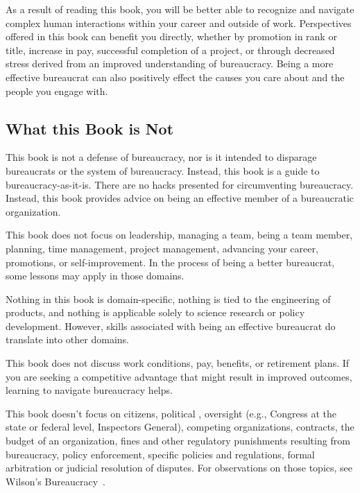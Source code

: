 As a result of reading this book, you will be better able to recognize and navigate complex human interactions within your career and outside of work. Perspectives offered in this book can benefit you directly, whether by promotion in rank or title, increase in pay, successful completion of a project, or through decreased stress derived from an improved understanding of  bureaucracy. Being a more effective bureaucrat can also positively effect the causes you care about and the people you engage with.



\subsection*{What this Book is Not}

This book is not a defense of bureaucracy, nor is it intended to disparage bureaucrats or the system of bureaucracy. Instead, this book is a guide to bureaucracy-as-it-is. There are no hacks presented for circumventing bureaucracy. Instead, this book provides advice on being an effective member of a bureaucratic organization.

This book does not focus on leadership, managing a team, being a team member, planning, time management, project management, advancing your career, promotions, or self-improvement. In the process of being a better bureaucrat, some lessons may apply in those domains.


Nothing in this book is domain-specific, nothing is tied to the engineering of products, and nothing is applicable solely to science research or policy development. However, skills associated with being an effective bureaucrat do translate into other domains.


This book does not discuss work conditions, pay, benefits, or retirement plans. If you are seeking a competitive advantage that might result in improved outcomes, learning to navigate bureaucracy helps.


This book doesn't focus on citizens, political 
\iftoggle{glossarysubstitutionworks}{\glspl{policymaker}}{policymakers}, oversight (e.g., Congress at the state or federal level, Inspectors General), 
competing organizations, contracts, the budget of an organization, fines and other regulatory punishments resulting from bureaucracy, policy enforcement, specific policies and regulations, formal arbitration or judicial resolution of disputes. For observations on those topics, see Wilson's Bureaucracy~\cite{1991_Wilson}. 


